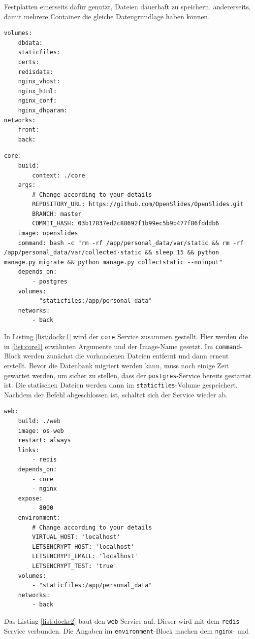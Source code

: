 \documentclass[11pt,a4paper]{article}
\begin{document}
Festplatten einerseits dafür genutzt, Dateien dauerhaft zu speichern, 
andererseits, damit mehrere Container die gleiche Datengrundlage haben können.
\begin{lstlisting}[firstnumber=152,
	caption=\texttt{docker-compose.yml} Teil 11 - 
	\cite{osdockcont},
	label={list:dockc11}]
volumes:
	dbdata:
	staticfiles:
	certs:
	redisdata:
	nginx_vhost:
	nginx_html:
	nginx_conf:
	nginx_dhparam:
networks:
	front:
	back:
\end{lstlisting}
\newpage
\begin{lstlisting}[firstnumber=3,
	caption=\texttt{docker-compose.yml} Teil 1 - 
	\cite{osdockcont},
	label={list:dockc1}]
core:
	build:
		context: ./core
	args:
		# Change according to your details
		REPOSITORY_URL: https://github.com/OpenSlides/OpenSlides.git
		BRANCH: master
		COMMIT_HASH: 03b17837ed2c88692f1b99ec5b9b477f86fdddb6
	image: openslides
	command: bash -c "rm -rf /app/personal_data/var/static && rm -rf /app/personal_data/var/collected-static && sleep 15 && python manage.py migrate && python manage.py collectstatic --noinput"
	depends_on:
		- postgres
	volumes:
		- "staticfiles:/app/personal_data"
	networks:
		- back
\end{lstlisting}
In Listing \ref{list:dockc1} wird der \texttt{core} Service zusammen gestellt. 
Hier werden die in \ref{list:core1} erwähnten Argumente und der Image-Name 
gesetzt. Im \texttt{command}-Block werden zunächst die vorhandenen 
Dateien entfernt und dann erneut erstellt. Bevor die Datenbank migriert werden 
kann, muss noch einige Zeit gewartet werden, um sicher zu stellen, dass der 
\texttt{postgres}-Service bereits gestartet ist. Die statischen Dateien werden 
dann im \texttt{staticfiles}-Volume gespeichert. Nachdem der Befehl 
abgeschlossen ist, schaltet sich der Service wieder ab.
\begin{lstlisting}[firstnumber=19,
	caption=\texttt{docker-compose.yml} Teil 2 - 
	\cite{osdockcont},
	label={list:dockc2}]
web:
	build: ./web
	image: os-web
	restart: always
	links:
		- redis
	depends_on:
		- core
		- nginx
	expose:
		- 8000
	environment:
		# Change according to your details
		VIRTUAL_HOST: 'localhost'
		LETSENCRYPT_HOST: 'localhost'
		LETSENCRYPT_EMAIL: 'localhost'
		LETSENCRYPT_TEST: 'true'
	volumes:
		- "staticfiles:/app/personal_data"
	networks:
		- back
\end{lstlisting}
Das Listing \ref{list:dockc2} baut den \texttt{web}-Service auf. Dieser wird 
mit dem \texttt{redis}-Service verbunden. Die Angaben im 
\texttt{environment}-Block machen dem \texttt{nginx}- und 
\end{document}
